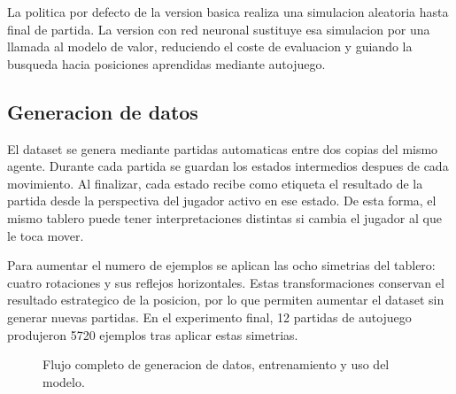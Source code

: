 \documentclass[conference,a4paper]{IEEEtran}
\begin{document}
La politica por defecto de la version basica realiza una simulacion aleatoria
hasta final de partida. La version con red neuronal sustituye esa simulacion por
una llamada al modelo de valor, reduciendo el coste de evaluacion y guiando la
busqueda hacia posiciones aprendidas mediante autojuego.

\subsection{Generacion de datos}

El dataset se genera mediante partidas automaticas entre dos copias del mismo
agente. Durante cada partida se guardan los estados intermedios despues de cada
movimiento. Al finalizar, cada estado recibe como etiqueta el resultado de la
partida desde la perspectiva del jugador activo en ese estado. De esta forma, el
mismo tablero puede tener interpretaciones distintas si cambia el jugador al que
le toca mover.

Para aumentar el numero de ejemplos se aplican las ocho simetrias del tablero:
cuatro rotaciones y sus reflejos horizontales. Estas transformaciones conservan
el resultado estrategico de la posicion, por lo que permiten aumentar el dataset
sin generar nuevas partidas. En el experimento final, 12 partidas de autojuego
produjeron 5720 ejemplos tras aplicar estas simetrias.

\begin{figure}[t]
\centering
{}
\caption{Flujo completo de generacion de datos, entrenamiento y uso del modelo.}
\label{fig:flujo-experimental}
\end{figure}
\end{document}
